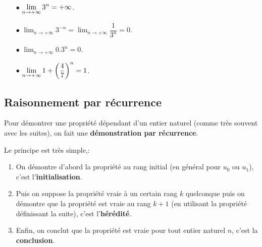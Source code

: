 \begin{example}

\begin{itemize}
 \item[$  \bullet$] $ \displaystyle \lim_{n \to  +\infty} 3^{n}= +\infty $.
 \item[$  \bullet$] $ \displaystyle \lim_{n \to  +\infty} 3^{-n}=\displaystyle\lim_{n \to  +\infty} \dfrac{1}{3^{n}} =0 $.
 \item[$  \bullet$] $  \displaystyle\lim_{n \to  +\infty} 0.3^{n}= 0 $.
 \item[$  \bullet$] $ \displaystyle \lim_{n \to  +\infty}1+ \left(\dfrac{4}{7}\right)^{n}= 1 $.
  \end{itemize}
\end{example}

\subsection{Raisonnement par récurrence} 
\begin{methode}
    Pour démontrer une propriété dépendant d'un entier naturel  (comme très souvent avec les suites), on 
    fait une \textbf{démonstration par récurrence}.
    
    Le principe est très simple,:
        \begin{enumerate}
            \item On  démontre   d'abord la propriété au rang initial (en général pour $u_0$ ou $u_1$), c'est l'\textbf{initialisation}.
            \item  Puis on suppose la propriété vraie à un certain rang $k$ quelconque puis on démontre que la propriété est vraie au rang $k+1$ (en utilisant la propriété définissant la suite), c'est l'\textbf{hérédité}.
                    \item Enfin, on conclut que la propriété est vraie pour tout  entier  naturel  $ n $, c'est la \textbf{conclusion}.
        \end{enumerate}
\end{methode}

